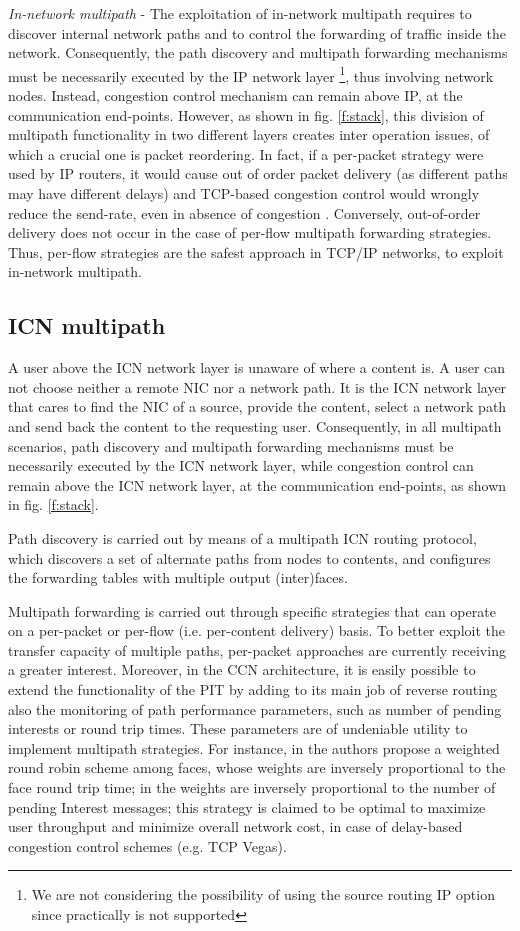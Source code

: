 \documentclass{sig-alternate-10pt}
\begin{document}
\emph{In-network multipath} - The exploitation of in-network multipath requires to discover internal network paths and to control the forwarding of traffic inside the network. Consequently, the path discovery and multipath forwarding mechanisms must be necessarily executed by the IP network layer \footnote{We are not considering the possibility of using the source routing IP option since practically is not supported}, thus involving network nodes. Instead, congestion control mechanism can remain above IP, at the communication end-points. However, as shown in fig. \ref{f:stack}, this division of multipath functionality in two different layers creates inter operation issues, of which a crucial one is packet reordering. In fact, if a per-packet strategy were used by IP routers, it would cause out of order packet delivery (as different paths may have different delays) and TCP-based congestion control would wrongly reduce the send-rate, even in absence of congestion \cite{lim2003tcp}. Conversely, out-of-order delivery does not occur in the case of per-flow multipath forwarding strategies. Thus, per-flow strategies are the safest approach in TCP/IP networks, to exploit in-network multipath.

\subsection*{ICN multipath}
A user above the ICN network layer is unaware of where a content is. A user can not choose neither a remote NIC nor a network path. It is the ICN network layer that cares to find the NIC of a source, provide the content, select a network path and send back the content to the requesting user. Consequently, in all multipath scenarios, path discovery and multipath forwarding mechanisms must be necessarily executed by the ICN network layer, while congestion control can remain above the ICN network layer, at the communication end-points, as shown in fig. \ref{f:stack}.

Path discovery is carried out by means of a multipath ICN routing protocol, which discovers a set of alternate paths from nodes to contents, and configures the forwarding tables with multiple output (inter)faces.


Multipath forwarding is carried out through specific strategies that can operate on a per-packet or per-flow (i.e. per-content delivery) basis. To better exploit the transfer capacity of multiple paths, per-packet approaches are currently receiving a greater interest. Moreover, in the CCN architecture, it is easily possible to extend the functionality of the PIT by adding to its main job of reverse routing also the monitoring of path performance parameters, such as number of pending interests or round trip times. These parameters are of undeniable utility to implement multipath strategies. For instance, in \cite{udugama} the authors propose a weighted round robin scheme among faces, whose weights are inversely proportional to the face round trip time; in \cite{carofigliooptimal} the weights are inversely proportional to the number of pending Interest messages; this strategy is claimed to be optimal to maximize user throughput and minimize overall network cost, in case of delay-based congestion control schemes (e.g. TCP Vegas).
\end{document}
